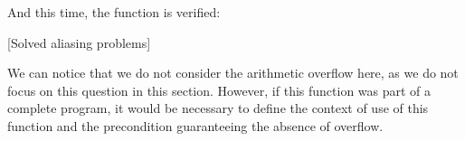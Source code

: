 


And this time, the function is verified:



[Solved aliasing problems]


We can notice that we do not consider the arithmetic overflow here, as
we do not focus on this question in this section. However, if this
function was part of a complete program, it would be necessary to define
the context of use of this function and the precondition guaranteeing
the absence of overflow.
